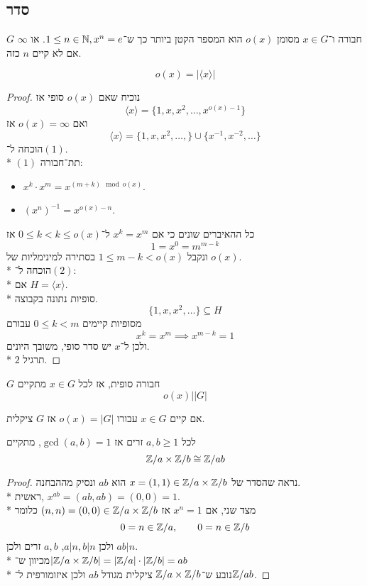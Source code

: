 \subsection{סדר}
\begin{definition}
	$G$ חבורה ו־$x \in G$ מסומן $o(x)$ הוא המספר הקטן ביותר כך ש־$1 \le n \in \mathbb{N}, x^n = e$. או $\infty$ אם לא קיים $n$ כזה.
\end{definition}
\begin{lemma}[סדר]
	\[
		o(x) = | \langle x\rangle|
	\]
\end{lemma}
\begin{proof}
	נוכיח שאם $o(x)$ סופי אז
	\[
		\langle x \rangle = \{ 1, x, x^2, \hdots, x^{o(x) - 1} \} \tag{1}
	\]
	ואם $o(x) = \infty$ אז
	\[
		\langle x \rangle = \{ 1, x, x^2, \hdots, \} \cup \{ x^{-1}, x^{-2}, \hdots \} \tag{2}
	\]
	הוכחה ל־$(1)$. \\*
	$(1)$ תת־חבורה:
	\begin{itemize}
		\item $x^k \cdot x^m = x^{(m + k) \mod o(x)}$.
		\item ${(x^n)}^{-1} = x^{o(x) - n}$.
	\end{itemize}
	כל ההאיברים שונים כי אם $x^k = x^m$ ל־$0 \le k < k \le o(x)$ אז
	\[
		1 = x^0 = m^{m - k}
	\]
	ונקבל $1 \le m - k < o(x)$ בסתירה למינימליות של $o(x)$. \\*
	הוכחה ל־$(2)$: \\*
	אם $H = \langle x \rangle$. \\*
	סופיות נתונה בקבוצה.
	\[
		\{1, x, x^2, \hdots \} \subseteq H
	\]
	מסופיות קיימים $0 \le k < m$ עבורם
	\[
		x^k = x^m \implies x^{m - k} = 1
	\]
	ולכן ל־$x$ יש סדר סופי, משובך היונים. \\*
	$2$ תרגיל.
\end{proof}
\begin{conclusion}
	$G$ חבורה סופית, אז לכל $x \in G$ מתקיים
	\[
		o(x) \Big| |G|
	\]
\end{conclusion}
\begin{conclusion}
	אם קיים $x \in G$ עבורו $o(x) = |G|$ אז $G$ ציקלית.
\end{conclusion}

\begin{proposition}
	לכל $a, b \ge 1$ זרים אז $\gcd(a, b) = 1$, מתקיים
	\[
		\mathbb{Z}/a \times \mathbb{Z}/b \cong \mathbb{Z}/ab
	\]
\end{proposition}
\begin{proof}
	נראה שהסדר של $x = (1, 1) \in \mathbb{Z}/a \times \mathbb{Z}/b$ הוא $ab$ ונסיק מההבחנה. \\*
	ראשית, $x^{ab} = (ab, ab) = (0, 0) = 1$. \\*
	מצד שני, אם $x^n = 1$ אז $(n, n) = (0, 0) \in \mathbb{Z}/a \times \mathbb{Z}/b$ כלומר
	\[
		0 = n \in \mathbb{Z}/a, \qquad 0 = n \in \mathbb{Z}/b
	\]
	ולכן $a | n, b | n$, $a, b$ זרים ולכן $ab | n$. \\*
	מכיוון ש־$|\mathbb{Z}/a \times \mathbb{Z}/b| = |\mathbb{Z}/a| \cdot |\mathbb{Z}/b| = ab$ \\*
	נובע ש־$\mathbb{Z}/a \times \mathbb{Z}/b$ ציקלית מגודל $ab$ ולכן איזומורפית ל־$\mathbb{Z}/ab$.
\end{proof}

